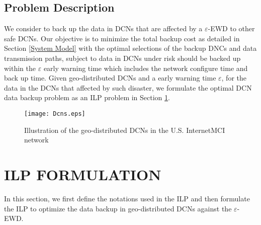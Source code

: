 \documentclass[conference]{IEEEtran}\IEEEoverridecommandlockouts
\begin{document}
\subsection{Problem Description}
We consider to back up the data in DCNs that are affected by a   $\varepsilon$-EWD to other safe DCNs.  Our objective is to minimize the total backup cost as detailed in Section \ref{System Model} with the optimal selections of the backup DNCs and data transmission paths, subject to data in DCNs under risk should be backed up within the $\varepsilon$ early warning time which includes the network configure time and back up time.  Given geo-distributed DCNs and a  early warning time $\varepsilon$, for the data in the DCNs that affected by such disaster,  we formulate the optimal DCN data backup problem as an ILP problem in Section \ref{ILP FORMULATION}.
\begin{figure}[t]
      \centering
      \texttt{[image: Dcns.eps]}
   \caption{Illustration of the geo-distributed DCNs in the  U.S. InternetMCI network}
   \label{fig:Illustration of geo-distributed DCNs in U.S. InternetMCI network}
  \end{figure}
 \section{ILP FORMULATION}\label{ILP FORMULATION}
In this section, we first define the notations used in the ILP and then formulate the ILP to optimize the data backup in geo-distributed DCNs against the $\varepsilon$-EWD.
\end{document}
